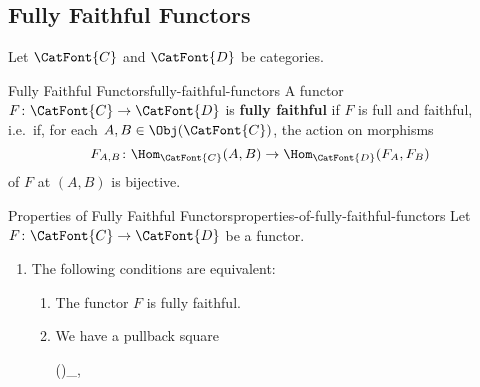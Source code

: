 \subsection{Fully Faithful Functors}\label{subsection-fully-faithful-functors}
Let $\CatFont{C}$ and $\CatFont{D}$ be categories.
\begin{definition}{Fully Faithful Functors}{fully-faithful-functors}%
    A functor $F\colon\CatFont{C}\to\CatFont{D}$ is \textbf{fully faithful} if $F$ is full and faithful, i.e.\ if, for each $A,B\in\Obj(\CatFont{C})$, the action on morphisms
    \[
        F_{A,B}
        \colon
        \Hom_{\CatFont{C}}(A,B)
        \to
        \Hom_{\CatFont{D}}(F_{A},F_{B})
    \]%
    of $F$ at $(A,B)$ is bijective.
\end{definition}
\begin{proposition}{Properties of Fully Faithful Functors}{properties-of-fully-faithful-functors}%
    Let $F\colon\CatFont{C}\to\CatFont{D}$ be a functor.
    \begin{enumerate}
        \item\label{properties-of-fully-faithful-functors-characterisations}The following conditions are equivalent:
            \begin{enumerate}
                \item\label{properties-of-fully-faithful-functors-characterisations-a}The functor $F$ is fully faithful.
                \item\label{properties-of-fully-faithful-functors-characterisations-b}We have a pullback square
                    \begin{webcompile}
                        \cong%
                        (\times{})\times_{\times{}},%
                        \quad
\end{webcompile}
\end{enumerate}
\end{enumerate}
\end{proposition}
